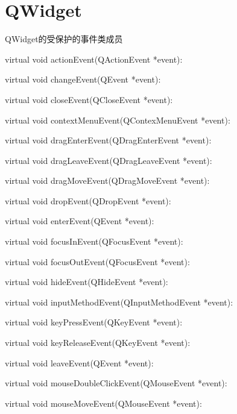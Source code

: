 \chapter{QWidget}
QWidget的受保护的事件类成员

\par
virtual void actionEvent(QActionEvent *event):

\par
virtual void changeEvent(QEvent *event):

\par
virtual void closeEvent(QCloseEvent *event):

\par
virtual void contextMenuEvent(QContexMenuEvent *event):

\par
virtual void dragEnterEvent(QDragEnterEvent *event):

\par
virtual void dragLeaveEvent(QDragLeaveEvent *event):

\par
virtual void dragMoveEvent(QDragMoveEvent *event):

\par
virtual void dropEvent(QDropEvent *event):

\par
virtual void enterEvent(QEvent *event):

\par
virtual void focusInEvent(QFocusEvent *event):

\par
virtual void focusOutEvent(QFocusEvent *event):

\par
virtual void hideEvent(QHideEvent *event):

\par
virtual void inputMethodEvent(QInputMethodEvent *event):

\par
virtual void keyPressEvent(QKeyEvent *event):

\par
virtual void keyReleaseEvent(QKeyEvent *event):

\par
virtual void leaveEvent(QEvent *event):

\par
virtual void mouseDoubleClickEvent(QMouseEvent *event):

\par
virtual void mouseMoveEvent(QMouseEvent *event):


